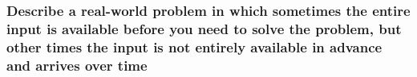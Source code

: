 \subsubsection{Describe a real-world problem in which sometimes the entire input is available before you need to solve the problem, but other times the input is not entirely available in advance and arrives over time}

\subsubsection{ }

\subsubsection{ }

\subsubsection{ }

\subsubsection{ }